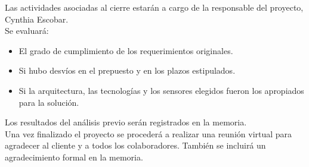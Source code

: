 \documentclass[
11pt, %
codirector, %
]{charter}
\begin{document}
Las actividades asociadas al cierre estarán a cargo de la responsable del proyecto, Cynthia Escobar. \\
Se evaluará:
\begin{itemize}
	\item El grado de cumplimiento de los requerimientos originales. 
	\item Si hubo desvíos en el prepuesto y en los plazos estipulados.
	\item Si la arquitectura, las tecnologías y los sensores elegidos fueron los apropiados para la solución.
\end{itemize}
Los resultados del análisis previo serán registrados en la memoria.\\
Una vez finalizado el proyecto se procederá a realizar una reunión virtual para agradecer al cliente y a todos los colaboradores. También se incluirá un agradecimiento formal en la memoria.
\end{document}
